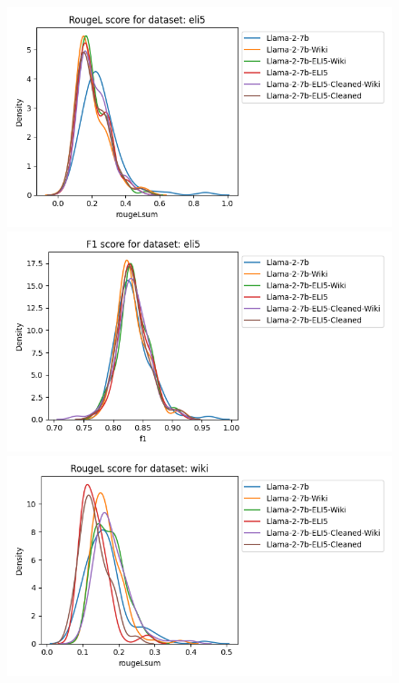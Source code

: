 \documentclass[11pt, oneside]{article}   	%
\begin{document}
\begin{figure}
\includegraphics[scale=.5]{./figures/rougelsum_7B_eli5}
\includegraphics[scale=.5]{./figures/bertscore_F1_7B_eli5}
\includegraphics[scale=.5]{./figures/rougelsum_7B_wiki}

\end{figure}
\end{document}
